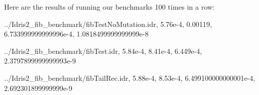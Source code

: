 \documentclass[
]{article}
\newenvironment{Shaded}{}{}
\newcommand{\DataTypeTok}[1]{\textcolor[rgb]{0.56,0.13,0.00}{#1}}
\newcommand{\FloatTok}[1]{\textcolor[rgb]{0.25,0.63,0.44}{#1}}
\newcommand{\NormalTok}[1]{#1}
\newcommand{\OperatorTok}[1]{\textcolor[rgb]{0.40,0.40,0.40}{#1}}
\begin{document}
Here are the results of running our benchmarks 100 times in a row:

\begin{Shaded}
\begin{Highlighting}[]
\OperatorTok{../}\DataTypeTok{Idris2\_fib\_benchmark}\OperatorTok{/}\NormalTok{fibTestNoMutation}\OperatorTok{.}\NormalTok{idr,}
\FloatTok{5.76e{-}4}\NormalTok{,}
\FloatTok{0.00119}\NormalTok{,}
\FloatTok{6.733999999999996e{-}4}\NormalTok{,}
\FloatTok{1.0818499999999999e{-}8}

\OperatorTok{../}\DataTypeTok{Idris2\_fib\_benchmark}\OperatorTok{/}\NormalTok{fibTest}\OperatorTok{.}\NormalTok{idr,}
\FloatTok{5.84e{-}4}\NormalTok{,}
\FloatTok{8.41e{-}4}\NormalTok{,}
\FloatTok{6.449e{-}4}\NormalTok{,}
\FloatTok{2.3797899999999993e{-}9}

\OperatorTok{../}\DataTypeTok{Idris2\_fib\_benchmark}\OperatorTok{/}\NormalTok{fibTailRec}\OperatorTok{.}\NormalTok{idr,}
\FloatTok{5.88e{-}4}\NormalTok{,}
\FloatTok{8.53e{-}4}\NormalTok{,}
\FloatTok{6.499100000000001e{-}4}\NormalTok{,}
\FloatTok{2.692301899999999e{-}9}


\end{Highlighting}
\end{Shaded}
\end{document}
